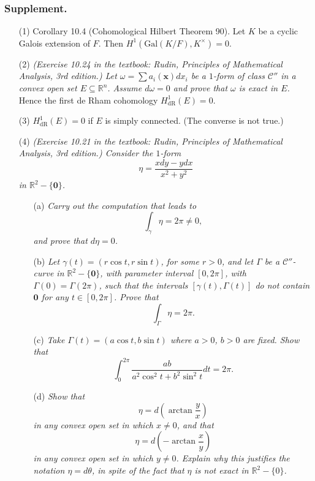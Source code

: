\documentclass{article}
\begin{document}
\subsubsection*{Supplement.}
\begin{enumerate}
\item[(1)]
  Corollary 10.4 (Cohomological Hilbert Theorem 90).
  Let $K$ be a cyclic Galois extension of $F$.
  Then $H^{1}(\mathrm{Gal}(K/F), K^{\times}) = 0$.

\item[(2)]
  \emph{(Exercise 10.24 in the textbook:
  Rudin, Principles of Mathematical Analysis, 3rd edition.)
  Let $\omega = \sum a_i(\mathbf{x}) dx_i$ be a $1$-form of class $\mathcal{C}''$
  in a convex open set $E \subseteq \mathbb{R}^n$.
  Assume $d\omega = 0$ and prove that $\omega$ is exact in $E$.}
  Hence the first de Rham cohomology $H^{1}_{\mathrm{dR}}(E) = 0$.

\item[(3)]
  $H^{1}_{\mathrm{dR}}(E) = 0$ if $E$ is simply connected.
  (The converse is not true.)

\item[(4)]
  \emph{(Exercise 10.21 in the textbook:
  Rudin, Principles of Mathematical Analysis, 3rd edition.)
  Consider the $1$-form
  \[
    \eta = \frac{x dy - y dx}{x^2+y^2}
  \]
  in $\mathbb{R}^2-\{\mathbf{0}\}$.}
  \begin{enumerate}
  \item[(a)]
    \emph{Carry out the computation that leads to
    \[
      \int_{\gamma} \eta = 2\pi \neq 0,
    \]
    and prove that $d\eta = 0$.}

  \item[(b)]
    \emph{Let $\gamma(t) = (r \cos t, r \sin t)$, for some $r > 0$,
    and let $\Gamma$ be a $\mathcal{C}''$-curve in $\mathbb{R}^2 - \{\mathbf{0}\}$,
    with parameter interval $[0,2\pi]$,
    with $\Gamma(0) = \Gamma(2\pi)$,
    such that the intervals $[\gamma(t),\Gamma(t)]$ do not contain $\mathbf{0}$
    for any $t \in [0,2\pi]$.
    Prove that
    \[
      \int_{\Gamma} \eta = 2\pi.
    \]}

  \item[(c)]
    \emph{Take $\Gamma(t) = (a\cos t, b\sin t)$ where $a > 0$, $b > 0$ are fixed.
    Show that}
    \[
      \int_{0}^{2\pi} \frac{ab}{a^2\cos^2 t + b^2 \sin^2 t}dt = 2\pi.
    \]

  \item[(d)]
    \emph{Show that
    \[
      \eta = d\left( \arctan\frac{y}{x} \right)
    \]
    in any convex open set in which $x \neq 0$, and that
    \[
      \eta = d\left( -\arctan\frac{x}{y} \right)
    \]
    in any convex open set in which $y \neq 0$.
    Explain why this justifies the notation $\eta = d\theta$,
    in spite of the fact that $\eta$ is not exact in $\mathbb{R}^2 - \{0\}$.}
  \end{enumerate}


\end{enumerate}
\end{document}
